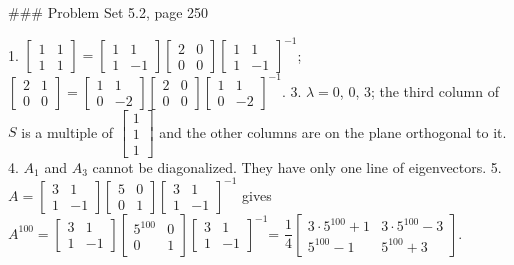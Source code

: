 ### Problem Set 5.2, page 250

1. \(\begin{bmatrix}1&1\\ 1&1\end{bmatrix}=\begin{bmatrix}1&1\\ 1&-1\end{bmatrix}\begin{bmatrix}2&0\\ 0&0\end{bmatrix}\begin{bmatrix}1&1\\ 1&-1\end{bmatrix}^{-1}\); \(\begin{bmatrix}2&1\\ 0&0\end{bmatrix}=\begin{bmatrix}1&1\\ 0&-2\end{bmatrix}\begin{bmatrix}2&0\\ 0&0\end{bmatrix}\begin{bmatrix}1&1\\ 0&-2\end{bmatrix}^{-1}\).
3. \(\lambda=0\), 0, 3; the third column of \(S\) is a multiple of \(\begin{bmatrix}1\\ 1\\ 1\end{bmatrix}\) and the other columns are on the plane orthogonal to it.
4. \(A_{1}\) and \(A_{3}\) cannot be diagonalized. They have only one line of eigenvectors.
5. \(A=\begin{bmatrix}3&1\\ 1&-1\end{bmatrix}\begin{bmatrix}5&0\\ 0&1\end{bmatrix}\begin{bmatrix}3&1\\ 1&-1\end{bmatrix}^{-1}\) gives \(A^{100}=\begin{bmatrix}3&1\\ 1&-1\end{bmatrix}\begin{bmatrix}5^{100}&0\\ 0&1\end{bmatrix}\begin{bmatrix}3&1\\ 1&-1\end{bmatrix}^{-1}\)= \(\dfrac{1}{4}\begin{bmatrix}3\cdot 5^{100}+1&3\cdot 5^{100}-3\\ 5^{100}-1&5^{100}+3\end{bmatrix}\).

 